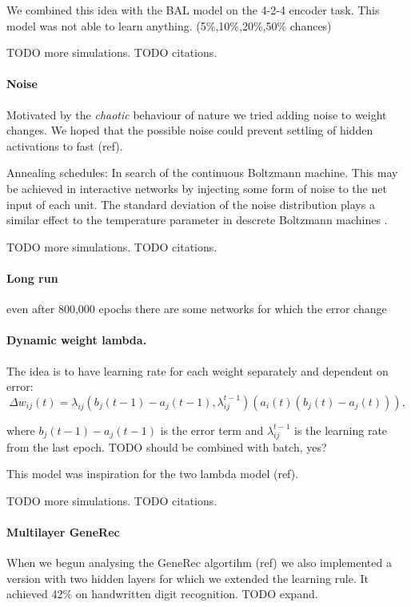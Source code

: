 We combined this idea with the BAL model on the 4-2-4 encoder task. This model was not able to learn anything. 
(5\%,10\%,20\%,50\% chances)

TODO more simulations. 
TODO citations.  

\paragraph{Noise} 

Motivated by the \emph{chaotic} behaviour of nature we tried adding noise to weight changes. We hoped that the possible noise could prevent settling of hidden activations to fast (ref). 

Annealing schedules: In search of the continuous Boltzmann machine. This may be achieved in interactive networks by injecting some form of noise to the net input of each unit. The standard deviation of the noise distribution plays a similar effect to the temperature parameter in descrete Boltzmann machines \citet{movellan1990contrastive}. 

TODO more simulations. 
TODO citations.  

\paragraph{Long run} 
even after 800,000 epochs there are some networks for which the error change

\paragraph{Dynamic weight lambda.} 

The idea is to have learning rate for each weight separately and dependent on error: 
\begin{equation}
\Delta w_{ij}(t) = \lambda_{ij}(b_j(t-1) - a_j(t-1), \lambda_{ij}^{t-1})(a_i(t)(b_j(t) - a_j(t))),
\end{equation}

where $b_j(t-1) - a_j(t-1)$ is the error term and $\lambda_{ij}^{t-1}$ is the learning rate from the last epoch. 
TODO should be combined with batch, yes? 

This model was inspiration for the two lambda model (ref). 

TODO more simulations. 
TODO citations.  

\paragraph{Multilayer GeneRec}

When we begun analysing the GeneRec algortihm (ref) we also implemented a version with two hidden layers for which we extended the learning rule. It achieved 42\% on handwritten digit recognition. 
TODO expand. 



